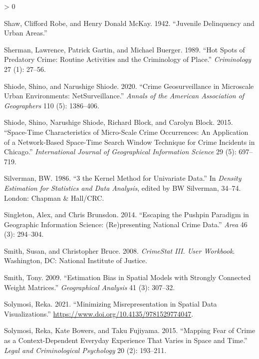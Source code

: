 \documentclass[
  krantz2]{krantz}
\newlength{\cslhangindent}
\newenvironment{CSLReferences}[2] %
 {%
  \setlength{\parindent}{0pt}
  \ifodd #1 \everypar{\setlength{\hangindent}{\cslhangindent}}\ignorespaces\fi
  \ifnum #2 > 0
  \setlength{\parskip}{#2\baselineskip}
  \fi
 }%
 {}
\begin{document}
\begin{CSLReferences}{1}{0}
\leavevmode\hypertarget{ref-Shaw_1942}{}%
Shaw, Clifford Robe, and Henry Donald McKay. 1942. {``Juvenile Delinquency and Urban Areas.''}

\leavevmode\hypertarget{ref-Sherman_1989}{}%
Sherman, Lawrence, Patrick Gartin, and Michael Buerger. 1989. {``Hot Spots of Predatory Crime: Routine Activities and the Criminology of Place.''} \emph{Criminology} 27 (1): 27--56.

\leavevmode\hypertarget{ref-Shiode_2020}{}%
Shiode, Shino, and Narushige Shiode. 2020. {``Crime Geosurveillance in Microscale Urban Environments: NetSurveillance.''} \emph{Annals of the American Association of Geographers} 110 (5): 1386--406.

\leavevmode\hypertarget{ref-Shiode_2015}{}%
Shiode, Shino, Narushige Shiode, Richard Block, and Carolyn Block. 2015. {``Space-Time Characteristics of Micro-Scale Crime Occurrences: An Application of a Network-Based Space-Time Search Window Technique for Crime Incidents in Chicago.''} \emph{International Journal of Geographical Information Science} 29 (5): 697--719.

\leavevmode\hypertarget{ref-Silverman_1986}{}%
Silverman, BW. 1986. {``3 the Kernel Method for Univariate Data.''} In \emph{Density Estimation for Statistics and Data Analysis}, edited by BW Silverman, 34--74. London: Chapman \& Hall/CRC.

\leavevmode\hypertarget{ref-Singleton_2014}{}%
Singleton, Alex, and Chris Brunsdon. 2014. {``Escaping the Pushpin Paradigm in Geographic Information Science: (Re)presenting National Crime Data.''} \emph{Area} 46 (3): 294--304.

\leavevmode\hypertarget{ref-Smith_2008}{}%
Smith, Susan, and Christopher Bruce. 2008. \emph{CrimeStat III. User Workbook}. Washington, DC: National Institute of Justice.

\leavevmode\hypertarget{ref-Smith_2009}{}%
Smith, Tony. 2009. {``Estimation Bias in Spatial Models with Strongly Connected Weight Matrices.''} \emph{Geographical Analysis} 41 (3): 307--32.

\leavevmode\hypertarget{ref-Solymosi_2021}{}%
Solymosi, Reka. 2021. {``Minimizing Misrepresentation in Spatial Data Visualizations.''} \url{https://www.doi.org/10.4135/9781529774047}.

\leavevmode\hypertarget{ref-Solymosi_2015}{}%
Solymosi, Reka, Kate Bowers, and Taku Fujiyama. 2015. {``Mapping Fear of Crime as a Context-Dependent Everyday Experience That Varies in Space and Time.''} \emph{Legal and Criminological Psychology} 20 (2): 193--211.


\end{CSLReferences}
\end{document}
